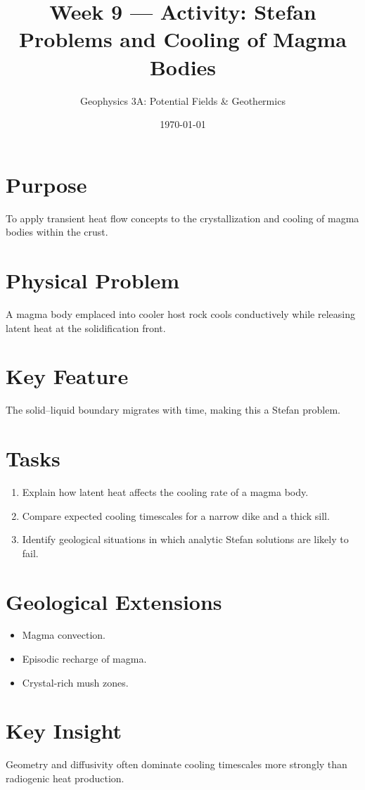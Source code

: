 \documentclass[11pt,a4paper]{article}
\title{Week 9 --- Activity: Stefan Problems and Cooling of Magma Bodies}
\author{Geophysics 3A: Potential Fields \& Geothermics}
\date{\today}
\begin{document}
\maketitle

\vspace{1em}

\section*{Purpose}
To apply transient heat flow concepts to the crystallization and cooling of magma bodies within the crust.

\section*{Physical Problem}
A magma body emplaced into cooler host rock cools conductively while releasing
latent heat at the solidification front.

\section*{Key Feature}
The solid--liquid boundary migrates with time, making this a Stefan problem.

\section*{Tasks}
\begin{enumerate}
  \item Explain how latent heat affects the cooling rate of a magma body.
  \item Compare expected cooling timescales for a narrow dike and a thick sill.
  \item Identify geological situations in which analytic Stefan solutions are
  likely to fail.
\end{enumerate}

\section*{Geological Extensions}
\begin{itemize}
  \item Magma convection.
  \item Episodic recharge of magma.
  \item Crystal-rich mush zones.
\end{itemize}

\section*{Key Insight}
Geometry and diffusivity often dominate cooling timescales more strongly than
radiogenic heat production.
\end{document}
